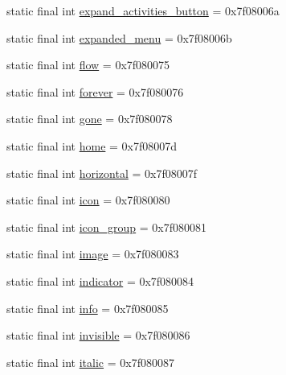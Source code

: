 \begin{DoxyCompactItemize}
\item 
static final int \mbox{\hyperlink{classcom_1_1synnapps_1_1carouselview_1_1_r_1_1id_a4d47d4d27b7335d074578066756fb00d}{expand\+\_\+activities\+\_\+button}} = 0x7f08006a
\item 
static final int \mbox{\hyperlink{classcom_1_1synnapps_1_1carouselview_1_1_r_1_1id_ac9c4f64e7c18cb02dc4ba45941c9b623}{expanded\+\_\+menu}} = 0x7f08006b
\item 
static final int \mbox{\hyperlink{classcom_1_1synnapps_1_1carouselview_1_1_r_1_1id_a2fa07d38896ddef68919239827928ced}{flow}} = 0x7f080075
\item 
static final int \mbox{\hyperlink{classcom_1_1synnapps_1_1carouselview_1_1_r_1_1id_a30f5d58a35470f3a657697b440b4d1bb}{forever}} = 0x7f080076
\item 
static final int \mbox{\hyperlink{classcom_1_1synnapps_1_1carouselview_1_1_r_1_1id_a9b19a7136f32cb1525a1cabfb1a3aee2}{gone}} = 0x7f080078
\item 
static final int \mbox{\hyperlink{classcom_1_1synnapps_1_1carouselview_1_1_r_1_1id_ab6bec8184b1c5afe5d5c0dcde461e7b5}{home}} = 0x7f08007d
\item 
static final int \mbox{\hyperlink{classcom_1_1synnapps_1_1carouselview_1_1_r_1_1id_ab861d54ce3037b096e817b23cd0042d5}{horizontal}} = 0x7f08007f
\item 
static final int \mbox{\hyperlink{classcom_1_1synnapps_1_1carouselview_1_1_r_1_1id_ab3ec0640d80bfd8681719819640287bb}{icon}} = 0x7f080080
\item 
static final int \mbox{\hyperlink{classcom_1_1synnapps_1_1carouselview_1_1_r_1_1id_a79b28693841723d9660b9c484d44eb82}{icon\+\_\+group}} = 0x7f080081
\item 
static final int \mbox{\hyperlink{classcom_1_1synnapps_1_1carouselview_1_1_r_1_1id_a9e2275db576517b52d2f6c77a2b43f7d}{image}} = 0x7f080083
\item 
static final int \mbox{\hyperlink{classcom_1_1synnapps_1_1carouselview_1_1_r_1_1id_a9e95ec5538237b8dbd239a6d096dfd60}{indicator}} = 0x7f080084
\item 
static final int \mbox{\hyperlink{classcom_1_1synnapps_1_1carouselview_1_1_r_1_1id_adf57764d2a445740cf8f79aa37bbdbc3}{info}} = 0x7f080085
\item 
static final int \mbox{\hyperlink{classcom_1_1synnapps_1_1carouselview_1_1_r_1_1id_a4d473c1487d362165b7a7cbf9718ef2d}{invisible}} = 0x7f080086
\item 
static final int \mbox{\hyperlink{classcom_1_1synnapps_1_1carouselview_1_1_r_1_1id_a5c448f4515ae838584574be1c981b336}{italic}} = 0x7f080087

\end{DoxyCompactItemize}
